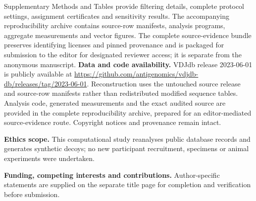 \documentclass[pdflatex,sn-basic,Numbered]{sn-jnl}
\begin{document}
\backmatter
{}
Supplementary Methods and Tables provide filtering details, complete protocol settings, assignment certificates and sensitivity results. The accompanying reproducibility archive contains source-row manifests, analysis programs, aggregate measurements and vector figures. The complete source-evidence bundle preserves identifying licenses and pinned provenance and is packaged for submission to the editor for designated reviewer access; it is separate from the anonymous manuscript.
\textbf{Data and code availability.} VDJdb release 2023-06-01 is publicly available at \url{https://github.com/antigenomics/vdjdb-db/releases/tag/2023-06-01}. Reconstruction uses the untouched source release and source-row manifests rather than redistributed modified sequence tables. Analysis code, generated measurements and the exact audited source are provided in the complete reproducibility archive, prepared for an editor-mediated source-evidence route. Copyright notices and provenance remain intact.\par
\textbf{Ethics scope.} This computational study reanalyses public database records and generates synthetic decoys; no new participant recruitment, specimens or animal experiments were undertaken.\par
\textbf{Funding, competing interests and contributions.} Author-specific statements are supplied on the separate title page for completion and verification before submission.
\setlength{\bibsep}{0.45em}

\end{document}
